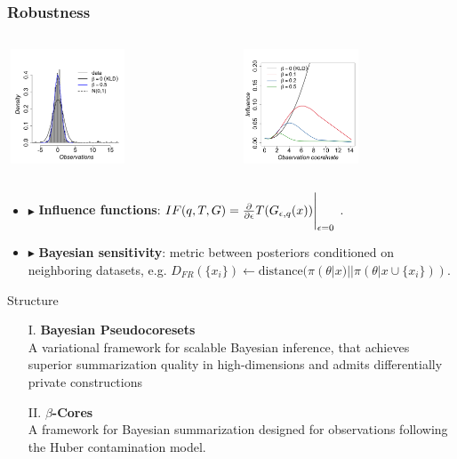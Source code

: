 \documentclass[hyperref={colorlinks = true},unknownkeysallowed]{beamer}
\let\oldcitep=\citep
\renewcommand\citep[1]{\hypersetup{linkcolor=darkred}\hyperlink{#1}{\oldcitep{#1}}}
\begin{document}
\begin{frame}
	\frametitle{Robustness}
	\begin{columns}
		\begin{column}{0.48\textwidth}
			\centering 
			\includegraphics[width=3.6cm,height=3.4cm]{figs/density.png}%
		\end{column}
		\begin{column}{0.48\textwidth}
			\centering
			\includegraphics[width=3.6cm,height=3.4cm]{figs/influence.png}%
		\end{column}
	\end{columns}
		\begin{itemize}
			\item $\blacktriangleright$ \textbf{Influence functions}: $IF(q, T, G) = \frac{\partial}{\partial \epsilon} T(G_{\epsilon, q}(x))\Bigg\rvert_{\epsilon=0}$ \citep{huber09}.
			\item $\blacktriangleright$ \textbf{Bayesian sensitivity}: metric between posteriors conditioned on neighboring datasets, e.g. $D_{FR}(\{x_i\}) \leftarrow \text{distance}(\pi(\theta|x)||\pi(\theta|x\cup\{x_i\}))$\citep{kurtek15}.	
		\end{itemize}
\end{frame}


\begin{frame}{Structure}
	\begin{itemize}
		\item[I.]\textbf{Bayesian Pseudocoresets} \small{\citep{psvi}} \\
		A variational framework for scalable Bayesian inference, that achieves superior summarization quality in high-dimensions and admits differentially private constructions
		\item[II.]\textbf{$\beta$-Cores} \small{\citep{beta-cores}}  \\
		A framework for Bayesian summarization designed for observations following the Huber contamination model.
	\end{itemize}
\end{frame}
\end{document}
